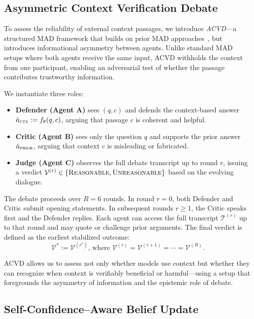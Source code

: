 \documentclass[11pt]{article}
\begin{document}
\subsection{Asymmetric Context Verification Debate}
\label{subsec:acvd}

To assess the reliability of external context passages, we introduce \textit{ACVD}—a structured MAD framework that builds on prior MAD approaches~\citep{du2023improving,michael2023debate,lang2025debate}, but introduces informational asymmetry between agents. Unlike standard MAD setups where both agents receive the same input, ACVD withholds the context from one participant, enabling an adversarial test of whether the passage contributes trustworthy information.

We instantiate three roles:
\begin{itemize}[itemsep=1pt, topsep=2pt, leftmargin=*, labelsep=0.5em]
    \item \textbf{Defender (Agent A)} sees \((q, c)\) and defends the context-based answer \(\hat{a}_{\textsc{ctx}} := f_{\theta}(q, c)\), arguing that passage \(c\) is coherent and helpful.
    \item \textbf{Critic (Agent B)} sees only the question \(q\) and supports the prior answer \(\hat{a}_{\textsc{prior}}\), arguing that context \(c\) is misleading or fabricated.
    \item \textbf{Judge (Agent C)} observes the full debate transcript up to round \(r\), issuing a verdict \(\mathcal{V}^{(r)} \in \{\textsc{Reasonable}, \textsc{Unreasonable}\}\) based on the evolving dialogue.
\end{itemize}

The debate proceeds over \(R = 6\) rounds. In round \(r = 0\), both Defender and Critic submit opening statements. In subsequent rounds \(r \ge 1\), the Critic speaks first and the Defender replies. Each agent can access the full transcript \(\mathcal{T}^{(r)}\) up to that round and may quote or challenge prior arguments. The final verdict is defined as the earliest stabilized outcome:
\[
\mathcal{V}^* := \mathcal{V}^{(r^*)}, \, \text{where } \mathcal{V}^{(r)} = \mathcal{V}^{(r+1)} = \cdots = \mathcal{V}^{(R)}.
\]

ACVD allows us to assess not only whether models use context but whether they can recognize when context is verifiably beneficial or harmful—using a setup that foregrounds the asymmetry of information and the epistemic role of debate.



\subsection{Self-Confidence–Aware Belief Update}
 
\end{document}
